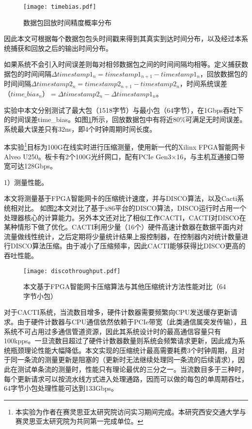 \begin{figure}[!ht]
	\centering 
	\texttt{[image: timebias.pdf]}
	\caption{数据包回放时间精度概率分布} \label{fig:timebias}
\end{figure}

因此本文可根据每个数据包包头时间戳来得到其真实到达时间分布，以及经过本系统捕获和回放之后的输出时间分布。

如果系统不会引入时间误差则每对相邻数据包之间的时间间隔均相等。定义捕获数据包的时间间隔$ \Delta timestamp1_n = timestamp1_{n+1} - timestamp1_{n} $，回放数据包的时间间隔$ \Delta timestamp2_n = timestamp2_{n+1} - timestamp2_{n} $，时间系统误差$ （time\_bias_n）=\Delta timestamp2_n - \Delta timestamp1_n $。



实验中本文分别测试了最大包（1518字节）与最小包（64字节），在1Gbps吞吐下的时间误差time\_bias。如图\ref{fig:timebias}所示，回放数据包中有将近80\%可满足无时间误差。系统最大误差只有32ns，即4个时钟周期时间长度。



本实验\footnote{本实验为作者在赛灵思亚太研究院访问实习期间完成。本研究西安交通大学与赛灵思亚太研究院为共同第一完成单位。}目标为100G在线实时进行压缩测量，使用新一代的Xilinx FPGA智能网卡Alveo U250。板卡有2个100G光纤网口，配有PCIe Gen3$ \times $16，与主机互通接口带宽可达128Gbps。

1）测量性能。

本文将测量基于FPGA智能网卡的压缩统计速度，并与DISCO算法，以及Cacti系统相对比。 如图\ref{fig:discothroughput}本文对比了基于x86平台的DISCO算法，DISCO运行时占用一个处理器核心的计算能力。另外本文还对比了相似工作CACTI，CACTI对DISCO在某种情形下做了优化。CACTI利用少量（16个）硬件高速计数器在数据平面内对流量做线性统计，之后定期将少量统计结果上报控制器，在控制器内对统计数量进行DISCO算法压缩。由于减小了压缩频率，因此CACTI能够获得比DISCO更高的吞吐性能。

\begin{figure}[!ht]
	\centering 
	\texttt{[image: discothroughput.pdf]}
	\caption{本文基于FPGA智能网卡压缩算法与其他压缩统计方法性能对比（64字节小包）} \label{fig:discothroughput}
\end{figure}

对于CACTI系统，当流数目增多，硬件计数器需要频繁向CPU发送缓存更新请求。由于硬件计数器与CPU通信依然依赖于PCIe带宽（此类通信属突发传输），且系统不可占用过多通信管道资源，因此其系统设计时的最高通信容量只有100kpps。一旦流数目超过了硬件计数器数量则系统会频繁请求更新，因此成为系统瓶颈理论性能大幅降低。本文实现的压缩统计最高需要耗费3个时钟周期，且对于同一条流的测量更新是阻塞的（更新时无法继续处理同一条流的后续请求），因此在测试单条流的测量时，性能只有理论最优的三分之一。当流数目多于三种时，每个更新请求可以按流水线方式进入处理通路，因而可以做的每包的单周期吞吐，64字节小包处理性能可达到133Gbps。


